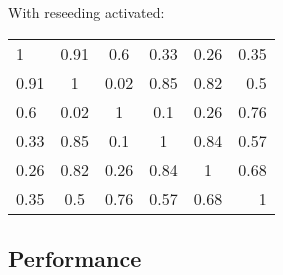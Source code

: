 \documentclass[a4paper, titlepage, 12pt]{article} %
\begin{document}
    With reseeding activated:\\
    \begin{tabular}{ l c c c c r }
     1 & 0.91 & 0.6 & 0.33 & 0.26 & 0.35 \\
     0.91 & 1 & 0.02 & 0.85 & 0.82 & 0.5 \\
     0.6 & 0.02 & 1 & 0.1 & 0.26 & 0.76 \\
     0.33 & 0.85 & 0.1 & 1 & 0.84 & 0.57 \\
     0.26 & 0.82 & 0.26 & 0.84 & 1 & 0.68 \\
     0.35 & 0.5 & 0.76 & 0.57 & 0.68 & 1 \\
    \end{tabular}
    
   \subsection{Performance}
    
    \scalebox{.8}{}
    \scalebox{.8}{}
    \scalebox{.8}{}
    \scalebox{.8}{}
    \scalebox{.8}{}
    \scalebox{.8}{}
    
\end{document}
